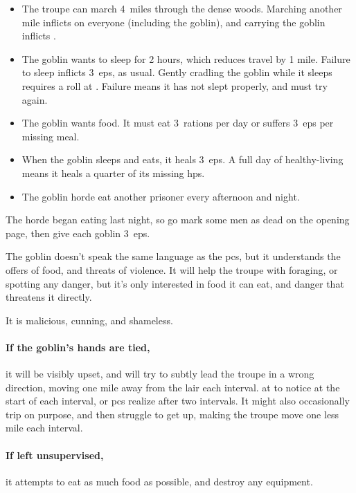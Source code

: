 \documentclass[10pt,twoside]{book}
\begin{document}
\begin{itemize}
  \item
  The troupe can march 4~miles through the dense woods.
  Marching another mile inflicts  on everyone (including the goblin), and carrying the goblin inflicts .
  \item
  The goblin wants to sleep for 2 hours, which reduces travel by 1 mile.
  Failure to sleep inflicts 3~\glspl{ep}, as usual.
  Gently cradling the goblin while it sleeps requires a  roll at \tn[8].
  Failure means it has not slept properly, and must try again.
  \item
  The goblin wants food.
  It must eat 3~\glspl{ration} per day or suffers 3~\glspl{ep} per missing meal.
  \item
  When the goblin sleeps and eats, it heals 3~\glspl{ep}.
  A full day of healthy-living means it heals a quarter of its missing \glspl{hp}.
  \item
  The goblin horde eat another prisoner every afternoon and night.
\end{itemize}

The horde began eating last night, so go mark some men as dead on the opening page, then give each goblin 3~\glspl{ep}.

The goblin doesn't speak the same language as the \glspl{pc}, but it understands the offers of food, and threats of violence.
It will help the troupe with foraging, or spotting any danger, but it's only interested in food it can eat, and danger that threatens it directly.

It is malicious, cunning, and shameless.

\paragraph{If the goblin's hands are tied,}
it will be visibly upset, and will try to subtly lead the troupe in a wrong direction, moving one mile away from the lair each \gls{interval}.
 at \tn[10] to notice at the start of each \gls{interval}, or \glspl{pc} realize after two \glspl{interval}.
It might also occasionally trip on purpose, and then struggle to get up, making the troupe move one less mile each \gls{interval}.

\paragraph{If left unsupervised,}
it attempts to eat as much food as possible, and destroy any equipment.
\end{document}
